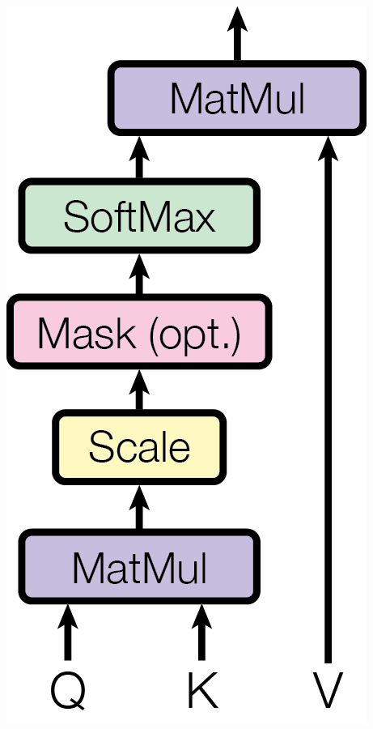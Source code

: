 \documentclass[]{beamer}
\begin{document}
\begin{frame}
\begin{columns}
\begin{column}[]{0.5\textwidth}
            \includegraphics[scale = 0.6]{ModalNet-19.png}
        \end{column}
    \end{columns}    
\end{frame}
\end{document}
